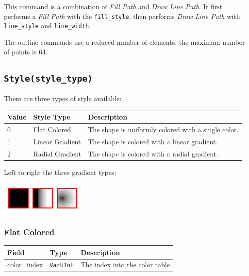 \documentclass[]{article}
\begin{document}
This command is a combination of \emph{Fill Path} and \emph{Draw Line Path}.
It first performs a \emph{Fill Path} with the \texttt{fill\_style}, then
performs \emph{Draw Line Path} with \texttt{line\_style} and
\texttt{line\_width}.

The outline commands use a reduced number of elements, the maximum
number of points is 64.

\hypertarget{stylestyle_type}{\subsection{\texorpdfstring{\texttt{Style(style\_type)}}{Style(style\_type)}}\label{stylestyle_type}}

There are three types of style available:

\begin{longtable}[]{@{}p{0.5in}p{1in}p{4.5in}@{}}
\toprule
Value & Style Type & Description \\
\midrule
\endhead
0 & Flat Colored & The shape is uniformly colored with a single
color. \\
1 & Linear Gradient & The shape is colored with a linear gradient. \\
2 & Radial Gradient & The shape is colored with a radial gradient. \\
\bottomrule
\end{longtable}

Left to right the three gradient types:

\begin{center}
\includegraphics{graphics/gradients.png}
\end{center}

\hypertarget{flat-colored}{\subsubsection{Flat Colored}\label{flat-colored}}

\begin{longtable}[]{@{}p{1in}p{1in}p{4in}@{}}
\toprule
Field & Type & Description \\
\midrule
\endhead
color\_index & \texttt{VarUInt} & The index into the color table \\
\bottomrule
\end{longtable}
\end{document}
